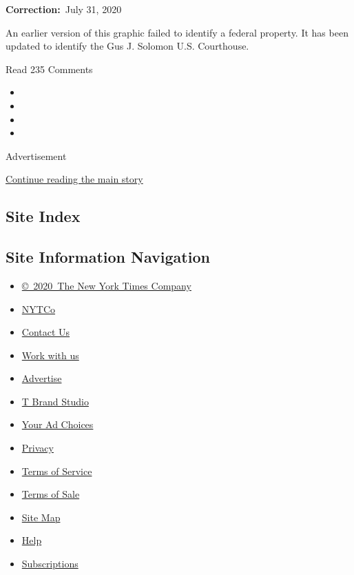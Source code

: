 \textbf{Correction:}~July 31, 2020

An earlier version of this graphic failed to identify a federal
property. It has been updated to identify the Gus J. Solomon U.S.
Courthouse.

Read 235 Comments

\begin{itemize}
\item
\item
\item
\item
\end{itemize}

Advertisement

\protect\hyperlink{after-bottom}{Continue reading the main story}

\hypertarget{site-index}{%
\subsection{Site Index}\label{site-index}}

\hypertarget{site-information-navigation}{%
\subsection{Site Information
Navigation}\label{site-information-navigation}}

\begin{itemize}
\tightlist
\item
  \href{https://help.nytimes3xbfgragh.onion/hc/en-us/articles/115014792127-Copyright-notice}{©~2020~The
  New York Times Company}
\end{itemize}

\begin{itemize}
\tightlist
\item
  \href{https://www.nytco.com/}{NYTCo}
\item
  \href{https://help.nytimes3xbfgragh.onion/hc/en-us/articles/115015385887-Contact-Us}{Contact
  Us}
\item
  \href{https://www.nytco.com/careers/}{Work with us}
\item
  \href{https://nytmediakit.com/}{Advertise}
\item
  \href{http://www.tbrandstudio.com/}{T Brand Studio}
\item
  \href{https://www.nytimes3xbfgragh.onion/privacy/cookie-policy\#how-do-i-manage-trackers}{Your
  Ad Choices}
\item
  \href{https://www.nytimes3xbfgragh.onion/privacy}{Privacy}
\item
  \href{https://help.nytimes3xbfgragh.onion/hc/en-us/articles/115014893428-Terms-of-service}{Terms
  of Service}
\item
  \href{https://help.nytimes3xbfgragh.onion/hc/en-us/articles/115014893968-Terms-of-sale}{Terms
  of Sale}
\item
  \href{https://spiderbites.nytimes3xbfgragh.onion}{Site Map}
\item
  \href{https://help.nytimes3xbfgragh.onion/hc/en-us}{Help}
\item
  \href{https://www.nytimes3xbfgragh.onion/subscription?campaignId=37WXW}{Subscriptions}
\end{itemize}
